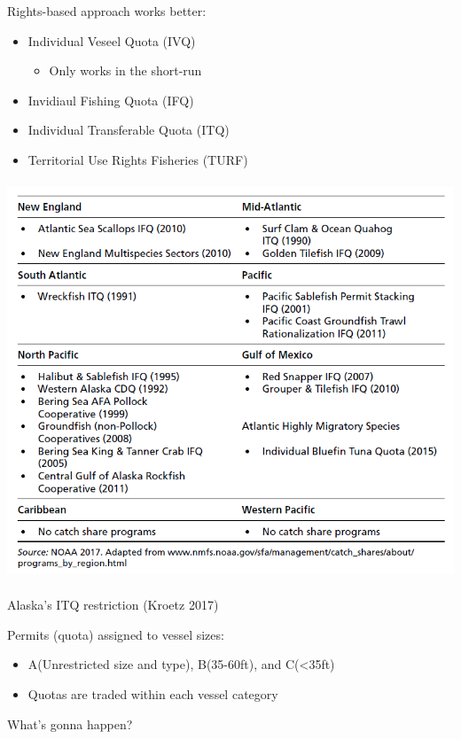 \begin{frame}{}
\protect\hypertarget{section-16}{}

Rights-based approach works better:

\begin{itemize}
\tightlist
\item
  Individual Veseel Quota (IVQ)

  \begin{itemize}
  \tightlist
  \item
    Only works in the short-run
  \end{itemize}
\item
  Invidiaul Fishing Quota (IFQ)
\item
  Individual Transferable Quota (ITQ)
\item
  Territorial Use Rights Fisheries (TURF)
\end{itemize}

\end{frame}

\begin{frame}{}
\protect\hypertarget{section-17}{}

\includegraphics[width=\textwidth,height=4.6875in]{figures/m4_fishing_regulation.png}

\end{frame}

\begin{frame}{Alaska's ITQ restriction (Kroetz 2017)}
\protect\hypertarget{alaskas-itq-restriction-kroetz-2017}{}

Permits (quota) assigned to vessel sizes:

\begin{itemize}
\tightlist
\item
  A(Unrestricted size and type), B(35-60ft), and C(\textless35ft)
\item
  Quotas are traded within each vessel category
\end{itemize}

What's gonna happen?

\end{frame}

